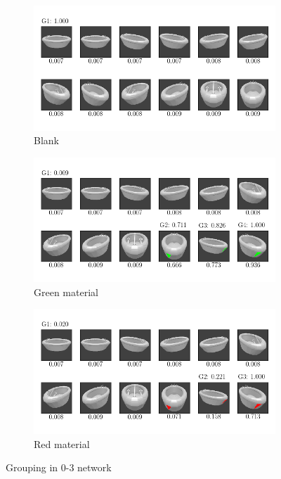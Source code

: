 \begin{figure}
	\centering
	\begin{subfigure}{\textwidth}
		\includegraphics[trim=10 20 10 20, clip]{images/mn-sl-0-3-20/bathtub_0107_0_grouping.png}
		\caption{Blank}
		\label{fig:grouping-0-3-blank}
	\end{subfigure}
	\begin{subfigure}{\textwidth}
		\includegraphics[trim=10 20 10 20, clip]{images/mn-sl-0-3-20/bathtub_0107_1_grouping.png}
		\caption{Green material}
		\label{fig:grouping-0-3-green}
	\end{subfigure}
	\begin{subfigure}{\textwidth}
		\includegraphics[trim=10 20 10 20, clip]{images/mn-sl-0-3-20/bathtub_0107_2_grouping.png}
		\caption{Red material}
		\label{fig:grouping-0-3-red}
	\end{subfigure}
	\caption[Grouping in 0-3 network]{Grouping in 0-3 network}
	\label{fig:grouping-0-3}
\end{figure}
